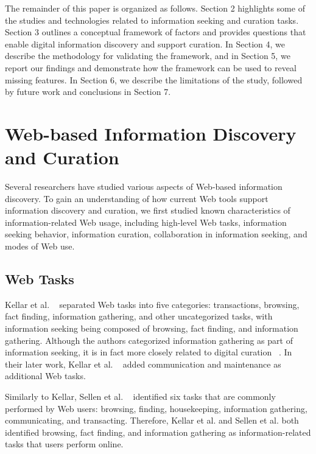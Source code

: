 \documentclass{casconpaper}
\begin{document}
{The remainder of this paper is organized as follows. Section 2 highlights some of the studies and technologies related to information seeking and curation tasks. Section 3 outlines a conceptual framework of factors and provides questions that enable digital information discovery and support curation. In Section 4, we describe the methodology for validating the framework, and in Section 5, we report our findings and demonstrate how the framework can be used to reveal missing features. In Section 6, we describe the limitations of the study, followed by future work and conclusions in Section 7.

} %


{\section{Web-based Information Discovery and Curation}

Several researchers have studied various aspects of Web-based information discovery. To gain an understanding of how current Web tools support information discovery and curation, we first studied known characteristics of information-related Web usage, including high-level Web tasks, information seeking behavior, information curation, collaboration in information seeking, and modes of Web use.  

{\subsection{Web Tasks}

Kellar et al. ~\cite{kellar2006} separated Web tasks into five categories: transactions, browsing, fact finding, information gathering, and other uncategorized tasks, with information seeking being composed of browsing, fact finding, and information gathering. Although the authors categorized information gathering as part of information seeking, it is in fact more closely related to digital curation ~\cite{beagrie, wittaker}. In their later work, Kellar et al. ~\cite{kellar2007} added communication and maintenance as additional Web tasks. 

Similarly to Kellar, Sellen et al. ~\cite{sellen} identified six tasks that are commonly performed by Web users: browsing, finding, housekeeping, information gathering, communicating, and transacting. Therefore, Kellar et al. and Sellen et al. both identified browsing, fact finding, and information gathering as information-related tasks that users perform online.   

}}
\end{document}
